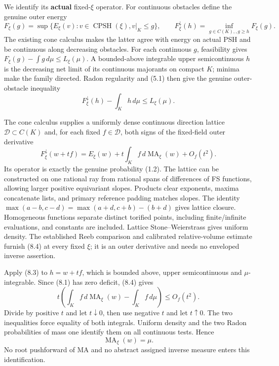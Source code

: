 \documentclass[
  10pt,
]{article}
\begin{document}
We identify its \textbf{actual} fixed-\(\xi\) operator. For continuous
obstacles define the genuine outer energy \[
 F_\xi(g)=\sup\{E_\xi(v):v\in\operatorname{CPSH}(\xi), v|_K\leq g\},
 \qquad
 F_\xi^\downarrow(h)=\inf_{g\in C(K),,g\geq h}F_\xi(g).
                                                               \tag{8.2}
\] The existing cone calculus makes the latter agree with energy on
actual PSH and be continuous along decreasing obstacles. For each
continuous \(g\), feasibility gives
\(F_\xi(g)-\int g\,d\mu\leq L_\xi(\mu)\). A bounded-above integrable
upper semicontinuous \(h\) is the decreasing net limit of its continuous
majorants on compact \(K\); minima make the family directed. Radon
regularity and (5.1) then give the genuine outer-obstacle inequality \[
                F_\xi^\downarrow(h)-\int_Kh\,d\mu\leq L_\xi(\mu).
                                                               \tag{8.3}
\]

The cone calculus supplies a uniformly dense continuous direction
lattice \(\mathcal D\subset C(K)\) and, for each fixed
\(f\in\mathcal D\), both signs of the fixed-field outer derivative \[
 F_\xi^\downarrow(w+tf)
      =E_\xi(w)+t\int_K f\,d\operatorname{MA}_\xi(w)+O_f(t^2).
                                                               \tag{8.4}
\] Its operator is exactly the genuine probability (1.2). The lattice
can be constructed on one rational ray from rational spans of
differences of FS functions, allowing larger positive equivariant
slopes. Products clear exponents, maxima concatenate lists, and primary
reference padding matches slopes. The identity
\(\max(a-b,c-d)=\max(a+d,c+b)-(b+d)\) gives lattice closure. Homogeneous
functions separate distinct torified points, including finite/infinite
evaluations, and constants are included. Lattice Stone--Weierstrass
gives uniform density. The established Reeb comparison and calibrated
relative-volume estimate furnish (8.4) at every fixed \(\xi\); it is an
outer derivative and needs no enveloped inverse assertion.

Apply (8.3) to \(h=w+tf\), which is bounded above, upper semicontinuous
and \(\mu\)-integrable. Since (8.1) has zero deficit, (8.4) gives \[
 t\left(\int_K f\,d\operatorname{MA}_\xi(w)-\int_K f\,d\mu\right)
                                                        \leq O_f(t^2).
\] Divide by positive \(t\) and let \(t\downarrow0\), then use negative
\(t\) and let \(t\uparrow0\). The two inequalities force equality of
both integrals. Uniform density and the two Radon probabilities of mass
one identify them on all continuous tests. Hence \[
                          \operatorname{MA}_\xi(w)=\mu.        \tag{8.5}
\] No root pushforward of MA and no abstract assigned inverse measure
enters this identification.
\end{document}
